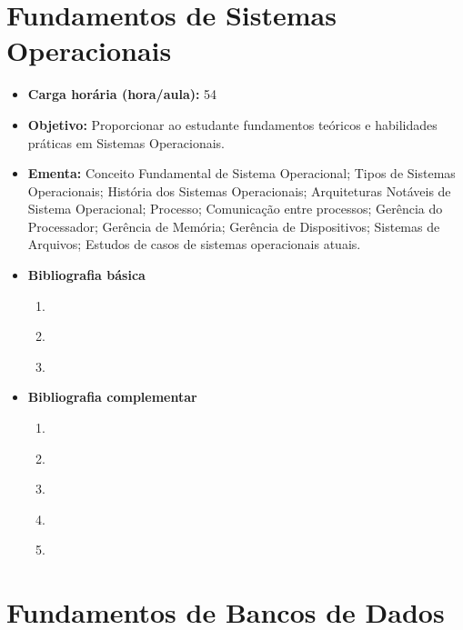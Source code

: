 \documentclass[11pt,fleqn]{book} %
\begin{document}
\section{Fundamentos de Sistemas Operacionais}\label{2_sistop}
\begin{itemize}
	\item \textbf{Carga horária (hora/aula):} 54
	\item \textbf{Objetivo:} Proporcionar ao estudante fundamentos teóricos e habilidades práticas em Sistemas Operacionais.
	\item \textbf{Ementa:} 
	Conceito Fundamental de Sistema Operacional; 
	Tipos de Sistemas Operacionais; 
	História dos Sistemas Operacionais; 
	Arquiteturas Notáveis de Sistema Operacional; 
	Processo; 
	Comunicação entre processos; 
	Gerência do Processador; 
	Gerência de Memória; 
	Gerência de Dispositivos; 
	Sistemas de Arquivos; 
	Estudos de casos de sistemas operacionais atuais.
	\item \textbf{Bibliografia básica}
	\begin{enumerate}
		\item \cite{tanenbaum_2008}
		\item \cite{tanenbaum_2010}
		\item \cite{deitel_deitel_choffnes_2010}
		
	\end{enumerate}
	\item \textbf{Bibliografia complementar}
	\begin{enumerate}
		\item \cite{brookshear_lee_oliveira}
		\item \cite{laureano_olsen_2010}
		\item \cite{machado_maia_2013}
		\item \cite{oliveira_romulo_2010}
		\item \cite{smith_2004}
	\end{enumerate}	
\end{itemize}


\newpage
\section{Fundamentos de Bancos de Dados}\label{2_bancodados}
\end{document}
